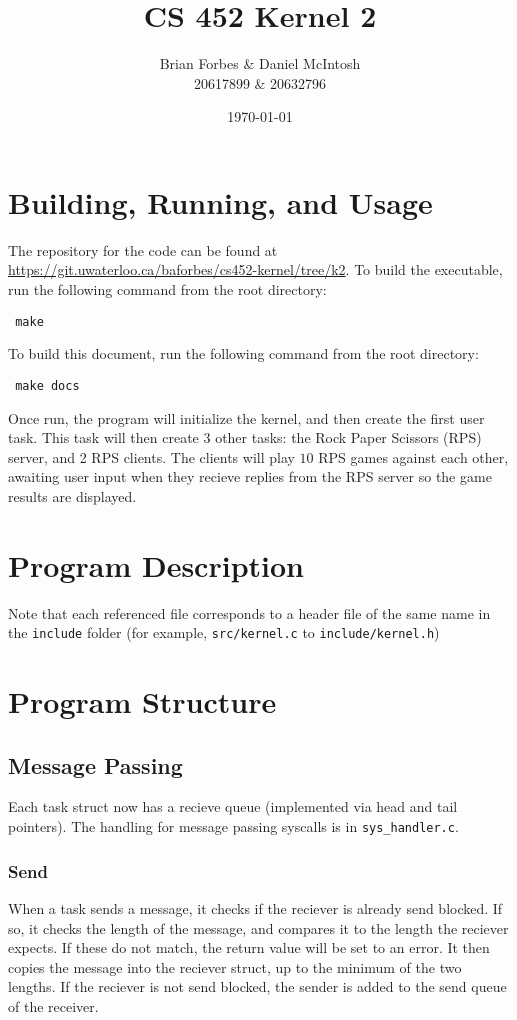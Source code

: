 \documentclass{article}
\begin{document}
\title{CS 452 Kernel 2}
\author{Brian Forbes \& Daniel McIntosh \\ 20617899 \& 20632796}
\date{\today}

\maketitle

\section{Building, Running, and Usage}

The repository for the code can be found at \url{https://git.uwaterloo.ca/baforbes/cs452-kernel/tree/k2}.
To build the executable, run the following command from the root directory: \begin{verbatim} make \end{verbatim}
To build this document, run the following command from the root directory: \begin{verbatim} make docs \end{verbatim}

Once run, the program will initialize the kernel, and then create the first user task. This task will then create 3 other tasks: the Rock Paper Scissors (RPS) server, and 2 RPS clients. The clients will play $10$ RPS games against each other, awaiting user input when they recieve replies from the RPS server so the game results are displayed.

\section{Program Description}
Note that each referenced file corresponds to a header file of the same name in the \verb|include| folder (for example, \verb|src/kernel.c| to \verb|include/kernel.h|)

\section{Program Structure}
\subsection{Message Passing}
Each task struct now has a recieve queue (implemented via head and tail pointers). The handling for message passing syscalls is in \verb|sys_handler.c|.
\subsubsection{Send}
    When a task sends a message, it checks if the reciever is already send blocked. If so, it checks the length of the message, and compares it to the length the reciever expects. If these do not match, the return value will be set to an error. It then copies the message into the reciever struct, up to the minimum of the two lengths.
    If the reciever is not send blocked, the sender is added to the send queue of the receiver.
\end{document}

